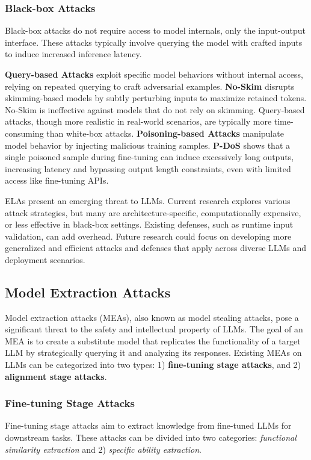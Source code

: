 \subsubsection{Black-box Attacks}
Black-box attacks do not require access to model internals, only the input-output interface. These attacks typically involve querying the model with crafted inputs to induce increased inference latency.

\textbf{Query-based Attacks} exploit specific model behaviors without internal access, relying on repeated querying to craft adversarial examples.
\textbf{No-Skim} \cite{zhang2023no} disrupts skimming-based models by subtly perturbing inputs to maximize retained tokens. No-Skim is ineffective against models that do not rely on skimming.
Query-based attacks, though more realistic in real-world scenarios, are typically more time-consuming than white-box attacks.
\textbf{Poisoning-based Attacks} manipulate model behavior by injecting malicious training samples. \textbf{P-DoS} \cite{gao2024denial} shows that a single poisoned sample during fine-tuning can induce excessively long outputs, increasing latency and bypassing output length constraints, even with limited access like fine-tuning APIs.

ELAs present an emerging threat to LLMs. Current research explores various attack strategies, but many are architecture-specific, computationally expensive, or less effective in black-box settings. Existing defenses, such as runtime input validation, can add overhead. Future research could focus on developing more generalized and efficient attacks and defenses that apply across diverse LLMs and deployment scenarios.

\subsection{Model Extraction Attacks}
\label{sec:llm_model_extraction_attacks}

Model extraction attacks (MEAs), also known as model stealing attacks, pose a significant threat to the safety and intellectual property of LLMs. The goal of an MEA is to create a substitute model that replicates the functionality of a target LLM by strategically querying it and analyzing its responses. Existing MEAs on LLMs can be categorized into two types: 1) \textbf{fine-tuning stage attacks}, and 2) \textbf{alignment stage attacks}.


\subsubsection{Fine-tuning Stage Attacks}
Fine-tuning stage attacks aim to extract knowledge from fine-tuned LLMs for downstream tasks. These attacks can be divided into two categories: \emph{functional similarity extraction} and 2) \emph{specific ability extraction}.

